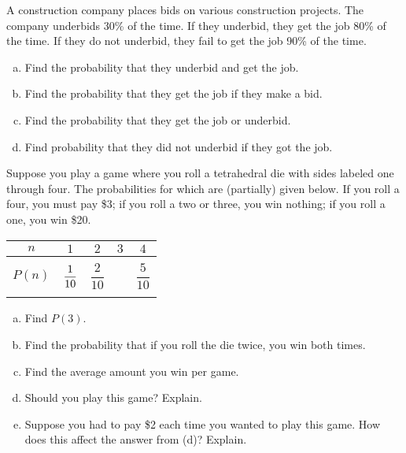 \documentclass[11pt,letterpaper]{article}
\begin{document}
\newpage





 A construction company places bids on various construction projects. The company underbids 30\% of the time. If they underbid, they get the job 80\% of the time. If they do not underbid, they fail to get the job 90\% of the time. 
	\begin{enumerate}[(a)]
	\item Find the probability that they underbid and get the job.
	\item Find the probability that they get the job if they make a bid. 
	\item Find the probability that they get the job or underbid. 
	\item Find probability that they did not underbid if they got the job. 
	\end{enumerate}





\newpage





 Suppose you play a game where you roll a tetrahedral die with sides labeled one through four. The probabilities for which are (partially) given below. If you roll a four, you must pay \$3; if you roll a two or three, you win nothing; if you roll a one, you win \$20. 
	\begin{table}[!ht]
	\centering 
	\begin{tabular}{|c||c|c|c|c|} \hline 
	$n$ & $1$ & $2$ & $3$ & $4$ \\ \hline 
	$P(n)$ & $\dfrac{1\rule{0pt}{2.9ex}}{10\rule[-1.3ex]{0pt}{0pt}}$ & $\dfrac{2}{10}$ & \phantom{$\dfrac{00}{00}$} & $\dfrac{5}{10}$ \\ \hline 
	\end{tabular}
	\end{table}

\begin{enumerate}[(a)]
\item Find $P(3)$. 
\item Find the probability that if you roll the die twice, you win both times. 
\item Find the average amount you win per game. 
\item Should you play this game? Explain.
\item Suppose you had to pay \$2 each time you wanted to play this game. How does this affect the answer from (d)? Explain. 
\end{enumerate}
\end{document}
